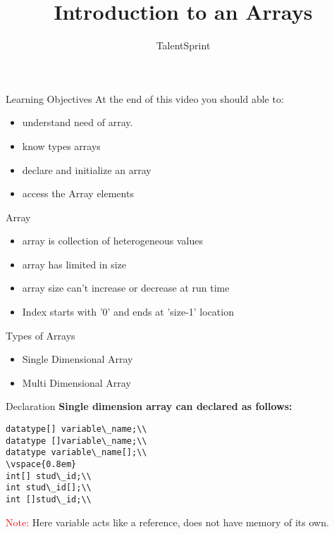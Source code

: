 \documentclass[aspectratio=169,14pt,usenames,dvipsnames]{beamer}
\title[Introduction to an Arrays]{Introduction to an Arrays}
\begin{document}
{\1
\begin{frame} \vspace{35pt}

\subtitle{TalentSprint}
\maketitle
\end{frame}
}

\begin{frame}{Learning Objectives}
At the end of this video you should able to:
\begin{itemize}
\item understand need of array.
\item know types arrays
\item declare and initialize an array
\item access the Array elements
\end{itemize}
\end{frame}

\begin{frame}{Array}
\begin{itemize}
\item array is collection of heterogeneous values
\item array has limited in size
\item array size can’t increase or decrease at run time
\item Index starts with ’0’ and ends at ’size-1’ location
\end{itemize}
\end{frame}



\begin{frame}{Types of Arrays}

\begin{itemize}
    \item Single Dimensional Array
    \item Multi Dimensional Array
\end{itemize}
\end{frame}

\begin{frame}{Declaration}
\textbf{Single dimension array can declared as follows:}
\begin{lstlisting}
datatype[] variable\_name;\\
datatype []variable\_name;\\
datatype variable\_name[];\\
\vspace{0.8em}
int[] stud\_id;\\
int stud\_id[];\\
int []stud\_id;\\
\end{lstlisting}
\textcolor{red}{Note:} Here variable acts like a reference, does not have memory of its own.
\end{frame}
\end{document}
